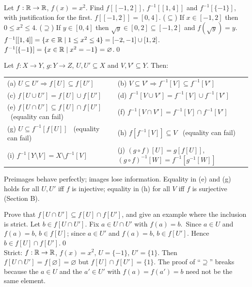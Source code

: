 \begin{hexample}
Let $f:\mathbb{R}\to\mathbb{R}$, $f(x)=x^2$. Find $f[[-1,2]]$, $f^{-1}[[1,4]]$ and $f^{-1}[\{-1\}]$, with justification for the first.
\solution
$f[[-1,2]]=[0,4]$. ($\subseteq$) If $x\in[-1,2]$ then $0\le x^2\le4$. ($\supseteq$) If $y\in[0,4]$ then $\sqrt y\in[0,2]\subseteq[-1,2]$ and $f(\sqrt y)=y$.\\
$f^{-1}[[1,4]]=\{x\in\mathbb{R}\mid 1\le x^2\le4\}=[-2,-1]\cup[1,2]$.\qquad $f^{-1}[\{-1\}]=\{x\in\mathbb{R}\mid x^2=-1\}=\varnothing$.\qed
\end{hexample}

\begin{result}
Let $f:X\to Y$, $g:Y\to Z$, $U,U'\subseteq X$ and $V,V'\subseteq Y$. Then:
\begin{center}\small
\begin{tabular}{@{}l l@{}}
\toprule
(a) $U\subseteq U'\Rightarrow f[U]\subseteq f[U']$ & (b) $V\subseteq V'\Rightarrow f^{-1}[V]\subseteq f^{-1}[V']$\\
(c) $f[U\cup U']=f[U]\cup f[U']$ & (d) $f^{-1}[V\cup V']=f^{-1}[V]\cup f^{-1}[V']$\\
(e) $f[U\cap U']\subseteq f[U]\cap f[U']$ \ (equality can fail) & (f) $f^{-1}[V\cap V']=f^{-1}[V]\cap f^{-1}[V']$\\
(g) $U\subseteq f^{-1}[f[U]]$ \ (equality can fail) & (h) $f[f^{-1}[V]]\subseteq V$ \ (equality can fail)\\
(i) $f^{-1}[Y\setminus V]=X\setminus f^{-1}[V]$ & (j) $(g\circ f)[U]=g[f[U]]$, \ $(g\circ f)^{-1}[W]=f^{-1}[g^{-1}[W]]$\\
\bottomrule
\end{tabular}
\end{center}
Preimages behave perfectly; images lose information. Equality in (e) and (g) holds for all $U,U'$ iff $f$ is injective; equality in (h) for all $V$ iff $f$ is surjective (Section B).
\end{result}

\begin{hexample}\label{ex:imgcap}
Prove that $f[U\cap U']\subseteq f[U]\cap f[U']$, and give an example where the inclusion is strict.
\solution
Let $b\in f[U\cap U']$. Fix $a\in U\cap U'$ with $f(a)=b$.\ Since $a\in U$ and $f(a)=b$, $b\in f[U]$; since $a\in U'$ and $f(a)=b$, $b\in f[U']$. Hence $b\in f[U]\cap f[U']$.\qed\\
Strict: $f:\mathbb{R}\to\mathbb{R}$, $f(x)=x^2$, $U=\{-1\}$, $U'=\{1\}$. Then $f[U\cap U']=f[\varnothing]=\varnothing$ but $f[U]\cap f[U']=\{1\}$. The proof of ``$\supseteq$'' breaks because the $a\in U$ and the $a'\in U'$ with $f(a)=f(a')=b$ need not be the same element.
\end{hexample}


